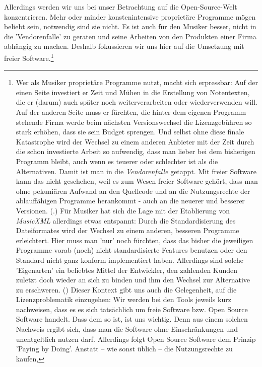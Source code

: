 Allerdings werden wir uns bei unser Betrachtung auf die Open-Source-Welt
konzentrieren. Mehr oder minder konstenintensive proprietäre Programme mögen
beliebt sein, notwendig sind sie nicht. Es ist auch für den Musiker besser,
nicht in die 'Vendorenfalle' zu geraten und seine Arbeiten von den Produkten
einer Firma abhängig zu machen. Deshalb fokussieren wir uns hier auf die
Umsetzung mit freier Software.\footnote{Wer als Musiker proprietäre Programme
nutzt, macht sich erpressbar: Auf der einen Seite investiert er Zeit und Mühen
in die Erstellung von Notentexten, die er (darum) auch später noch
weiterverarbeiten oder wiederverwenden will. Auf der anderen Seite muss er
fürchten, die hinter dem eigenen Programm stehende Firma werde beim nächsten
Versionswechsel die Lizenzgebühren so stark erhöhen, dass sie sein Budget
sprengen. Und selbst ohne diese finale Katastrophe wird der Wechsel zu einem
anderen Anbieter mit der Zeit durch die schon investierte Arbeit so aufwendig,
dass man lieber bei dem bisherigen Programm bleibt, auch wenn es teuerer oder
schlechter ist als die Alternativen. Damit ist man in die \textit{Vendorenfalle}
getappt. Mit freier Software kann das nicht geschehen, weil es zum Wesen freier
Software gehört, dass man ohne pekuniären Aufwand an den Quellcode und an die
Nutzungsrechte der ablauffähigen Programme herankommt - auch an die neuerer und
besserer Versionen. (\cite[vgl. dazu][\nopage wp]{FSF2018a}.) Für Musiker hat
sich die Lage mit der Etablierung von \textit{MusicXML} allerdings etwas
entspannt: Durch die Standardisierung des Dateiformates wird der Wechsel zu
einem anderen, besseren Programme erleichtert. Hier muss man 'nur' noch
fürchten, dass das bisher die jeweiligen Programme vorab (noch) nicht
standardisierte Features benutzen oder den Standard nicht ganz konform
implementiert haben. Allerdings sind solche 'Eigenarten' ein beliebtes Mittel
der Entwickler, den zahlenden Kunden zuletzt doch wieder an sich zu binden und
ihm den Wechsel zur Alternative zu erschweren. (\cite[Zur Lizenzierung von
MusicXML vgl. auch][\nopage wp.]{WpedMusicXML2018a}) Dieser Kontext gibt uns
auch die Gelegenheit, auf die Lizenzproblematik einzugehen: Wir werden bei den
Tools jeweils kurz nachweisen, dass es es sich tatsächlich um freie Software
bzw. Open Source Software handelt. Dass dem so ist, ist uns wichtig. Denn aus
einem solchen Nachweis ergibt sich, dass man die Software ohne Einschränkungen
und unentgeltlich nutzen darf. Allerdings folgt Open Source Software dem Prinzip
'Paying by Doing'. Anstatt -- wie sonst üblich -- die Nutzungsrechte zu kaufen,
}
